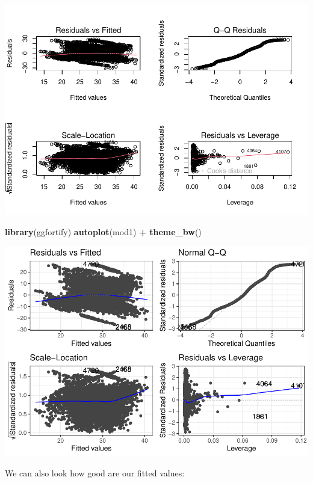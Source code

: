 \documentclass[
]{article}
\newenvironment{Shaded}{\begin{snugshade}}{\end{snugshade}}
\newcommand{\AttributeTok}[1]{\textcolor[rgb]{0.13,0.29,0.53}{#1}}
\newcommand{\FunctionTok}[1]{\textcolor[rgb]{0.13,0.29,0.53}{\textbf{#1}}}
\newcommand{\NormalTok}[1]{#1}
\newcommand{\SpecialCharTok}[1]{\textcolor[rgb]{0.81,0.36,0.00}{\textbf{#1}}}
\begin{document}
\includegraphics{Regression_files/figure-latex/unnamed-chunk-4-1.pdf}

\begin{Shaded}
\begin{Highlighting}[]
\FunctionTok{library}\NormalTok{(ggfortify)}
\FunctionTok{autoplot}\NormalTok{(mod1) }\SpecialCharTok{+} 
  \FunctionTok{theme\_bw}\NormalTok{()}
\end{Highlighting}
\end{Shaded}

\includegraphics{Regression_files/figure-latex/unnamed-chunk-5-1.pdf}

We can also look how good are our fitted values:

\begin{Shaded}
\end{Shaded}
\end{document}
